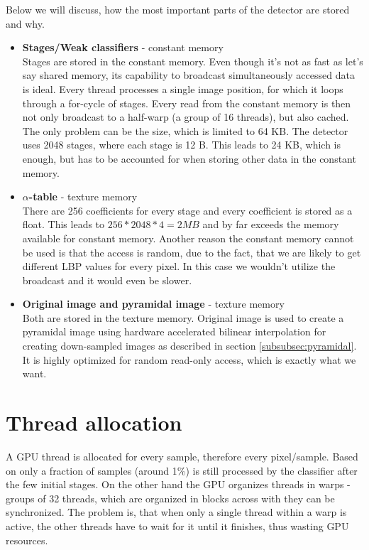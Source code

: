 Below we will discuss, how the most important parts of the detector are stored and why.

\begin{itemize}
\item \textbf{Stages/Weak classifiers} - constant memory \\
Stages are stored in the constant memory. Even though it's not as fast as let's say shared memory, its capability to broadcast simultaneously accessed data is ideal. Every thread processes a single image position, for which it loops through a for-cycle of stages. Every read from the constant memory is then not only broadcast to a half-warp (a group of 16 threads), but also cached. The only problem can be the size, which is limited to 64 KB. The detector uses 2048 stages, where each stage is 12 B. This leads to 24 KB, which is enough, but has to be accounted for when storing other data in the constant memory.

\item \textbf{$\alpha$-table} - texture memory \\
There are 256 coefficients for every stage and every coefficient is stored as a float. This leads to $256 * 2048 * 4 = 2 MB$ and by far exceeds the memory available for constant memory. Another reason the constant memory cannot be used is that the access is random, due to the fact, that we are likely to get different LBP values for every pixel. In this case we wouldn't utilize the broadcast and it would even be slower.

\item \textbf{Original image and pyramidal image} - texture memory \\
Both are stored in the texture memory. Original image is used to create a pyramidal image using hardware accelerated bilinear interpolation for creating down-sampled images as described in section \ref{subsubsec:pyramidal}. It is highly optimized for random read-only access, which is exactly what we want.
\end{itemize}

\section{Thread allocation}\label{sec:thread-alloc}

A GPU thread is allocated for every sample, therefore every pixel/sample. Based on \cite{herout2011real} only a fraction of samples (around 1\%) is still processed by the classifier after the few initial stages. On the other hand the GPU organizes threads in warps - groups of 32 threads, which are organized in blocks across with they can be synchronized. The problem is, that when only a single thread within a warp is active, the other threads have to wait for it until it finishes, thus wasting GPU resources.

